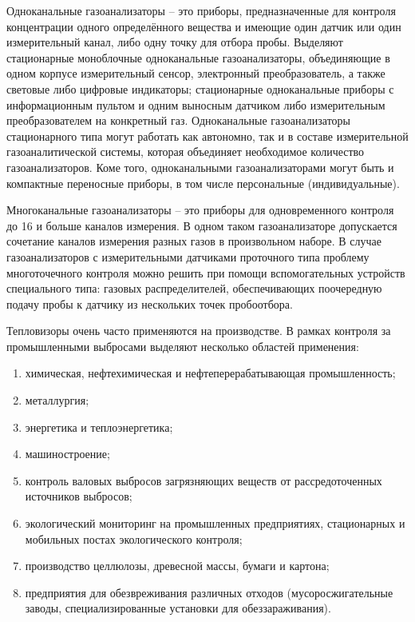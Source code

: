 \documentclass[14pt, a4paper]{extreport}
\begin{document}
	Одноканальные газоанализаторы -- это приборы, предназначенные для контроля концентрации одного определённого вещества и имеющие один датчик или один измерительный канал, либо одну точку для отбора пробы. Выделяют стационарные моноблочные одноканальные газоанализаторы, объединяющие в одном корпусе измерительный сенсор, электронный преобразователь, а также световые либо цифровые индикаторы; стационарные одноканальные приборы с информационным пультом и одним выносным датчиком либо измерительным преобразователем на конкретный газ. Одноканальные газоанализаторы стационарного типа могут работать как автономно, так и в составе измерительной газоаналитической системы, которая объединяет необходимое количество газоанализаторов. Коме того, одноканальными газоанализаторами могут быть и компактные переносные приборы, в том числе персональные (индивидуальные).
	
	Многоканальные газоанализаторы -- это приборы для одновременного контроля до 16 и больше каналов измерения. В одном таком газоанализаторе допускается сочетание каналов измерения разных газов в произвольном наборе. В случае газоанализаторов с измерительными датчиками проточного типа проблему многоточечного контроля можно решить при помощи вспомогательных устройств специального типа: газовых распределителей, обеспечивающих поочередную подачу пробы к датчику из нескольких точек пробоотбора. 
	
	Тепловизоры очень часто применяются на производстве. В рамках контроля за промышленными выбросами выделяют несколько областей применения:
	\begin{enumerate}[label={\arabic*)}]
		\item химическая, нефтехимическая и нефтеперерабатывающая промышленность;
		\item металлургия;
		\item энергетика и теплоэнергетика;
		\item машиностроение;
		\item контроль валовых выбросов загрязняющих веществ от рассредоточенных источников выбросов;
		\item экологический мониторинг на промышленных предприятиях, стационарных и мобильных постах экологического контроля;
		\item производство целлюлозы, древесной массы, бумаги и картона;
		\item предприятия для обезвреживания различных отходов (мусоросжигательные заводы, специализированные установки для обеззараживания).
	\end{enumerate}
	
\end{document}
